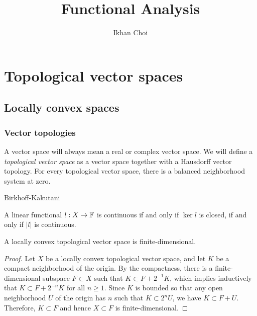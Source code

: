\documentclass{../../large}
\begin{document}
\title{Functional Analysis}
\author{Ikhan Choi}
\maketitle
\tableofcontents

\part{Topological vector spaces}


\chapter{Locally convex spaces}
\section{Vector topologies}

\begin{prb}
A vector space will always mean a real or complex vector space.
We will define a \emph{topological vector space} as a vector space together with a Hausdorff vector topology.
For every topological vector space, there is a balanced neighborhood system at zero.
\end{prb}

\begin{prb}
\end{prb}

\begin{prb}
\end{prb}
\begin{prb}
Birkhoff-Kakutani
\end{prb}


\begin{prb}
A linear functional $l:X\to\mathbb{F}$ is continuous if and only if $\ker l$ is closed, if and only if $|l|$ is continuous.
\end{prb}


\begin{prb}
A locally convex topological vector space is finite-dimensional.
\end{prb}
\begin{proof}
Let $X$ be a locally convex topological vector space, and let $K$ be a compact neighborhood of the origin.
By the compactness, there is a finite-dimensional subspace $F\subset X$ such that $K\subset F+2^{-1}K$, which implies inductively that $K\subset F+2^{-n}K$ for all $n\ge1$.
Since $K$ is bounded so that any open neighborhood $U$ of the origin has $n$ such that $K\subset2^nU$, we have $K\subset F+U$.
Therefore, $K\subset F$ and hence $X\subset F$ is finite-dimensional.
\end{proof}
\end{document}
